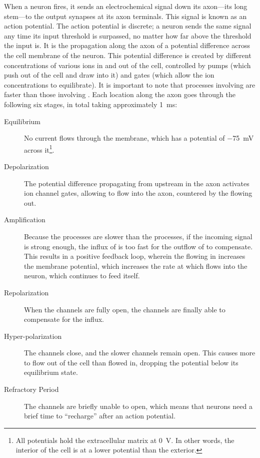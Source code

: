 When a neuron fires, it sends an electrochemical signal down its axon---its long stem---to the output synapses at its axon terminals.
This signal is known as an action potential.
The action potential is discrete; a neuron sends the same signal any time its input threshold is surpassed, no matter how far above the threshold the input is.
It is the propagation along the axon of a potential difference across the cell membrane of the neuron.
This potential difference is created by different concentrations of various ions in and out of the cell, controlled by pumps (which push  out of the cell and draw  into it) and gates (which allow the ion concentrations to equilibrate).
It is important to note that processes involving  are faster than those involving .
Each location along the axon goes through the following six stages, in total taking approximately \SI{1}{\ms}:
\begin{description}
\item[Equilibrium] No current flows through the membrane, which has a potential of \SI{-75}{\mV} across it\footnote{All potentials hold the extracellular matrix at \SI{0}{\V}.  In other words, the interior of the cell is at a lower potential than the exterior.}.

\item[Depolarization] The potential difference propagating from upstream in the axon activates ion channel gates, allowing  to flow into the axon, countered by the  flowing out.

\item[Amplification] Because the  processes are slower than the  processes, if the incoming signal is strong enough, the influx of  is too fast for the outflow of  to compensate.
  This results in a positive feedback loop, wherein the  flowing in increases the membrane potential, which increases the rate at which  flows into the neuron, which continues to feed itself.

\item[Repolarization] When the  channels are fully open, the  channels are finally able to compensate for the influx.

\item[Hyper-polarization] The  channels close, and the slower  channels remain open.
  This causes more  to flow out of the cell than  flowed in, dropping the potential below its equilibrium state.

\item[Refractory Period] The  channels are briefly unable to open, which means that neurons need a brief time to ``recharge'' after an action potential.

\end{description}

